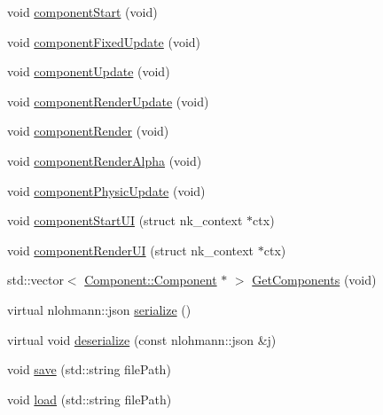 \begin{DoxyCompactItemize}
\item 
void \mbox{\hyperlink{class_beer_engine_1_1_game_object_a2770f244f916ffc2dcb1885f0f30f66d}{component\+Start}} (void)
\item 
void \mbox{\hyperlink{class_beer_engine_1_1_game_object_a50b9ea3bbd7fa155f5ab4b4b1da52b7a}{component\+Fixed\+Update}} (void)
\item 
void \mbox{\hyperlink{class_beer_engine_1_1_game_object_a91fdf1e47fe0ee4d9fd19c3c0bdbcc19}{component\+Update}} (void)
\item 
void \mbox{\hyperlink{class_beer_engine_1_1_game_object_a9b22312f43b60e3c1171ecd6d5afd09c}{component\+Render\+Update}} (void)
\item 
void \mbox{\hyperlink{class_beer_engine_1_1_game_object_a67e034a0ae38c2f61f7d2c23f104bebc}{component\+Render}} (void)
\item 
void \mbox{\hyperlink{class_beer_engine_1_1_game_object_aa3402c48cb3de30fbb382b57398c58ba}{component\+Render\+Alpha}} (void)
\item 
void \mbox{\hyperlink{class_beer_engine_1_1_game_object_ada13344658678ac8c9c62ea4df5b3ee0}{component\+Physic\+Update}} (void)
\item 
void \mbox{\hyperlink{class_beer_engine_1_1_game_object_aed0ebb4f7e1483594597d4dbea9252cc}{component\+Start\+UI}} (struct nk\+\_\+context $\ast$ctx)
\item 
void \mbox{\hyperlink{class_beer_engine_1_1_game_object_af6dedc2cd23d31e81dc412e8095b28ca}{component\+Render\+UI}} (struct nk\+\_\+context $\ast$ctx)
\item 
std\+::vector$<$ \mbox{\hyperlink{class_beer_engine_1_1_component_1_1_component}{Component\+::\+Component}} $\ast$ $>$ \mbox{\hyperlink{class_beer_engine_1_1_game_object_a090858d4edf1420427cd329688bc2e7c}{Get\+Components}} (void)
\item 
virtual nlohmann\+::json \mbox{\hyperlink{class_beer_engine_1_1_game_object_a4b1436f051194c385b9a82ad8fbb0c5b}{serialize}} ()
\item 
virtual void \mbox{\hyperlink{class_beer_engine_1_1_game_object_a68a7f2c23d06d575e683705195821c87}{deserialize}} (const nlohmann\+::json \&j)
\item 
void \mbox{\hyperlink{class_beer_engine_1_1_game_object_ad30b590f6d7a6556612358e4e14e79df}{save}} (std\+::string file\+Path)
\item 
void \mbox{\hyperlink{class_beer_engine_1_1_game_object_a826c9b7b4077db777e3cf563c1d0328e}{load}} (std\+::string file\+Path)
\end{DoxyCompactItemize}
